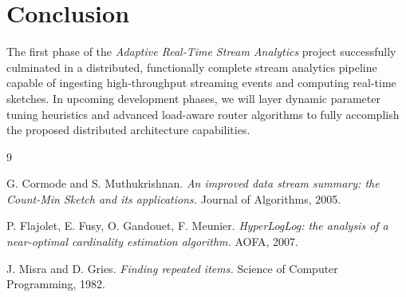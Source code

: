 \documentclass[12pt,a4paper]{article}
\begin{document}
\section{Conclusion}
The first phase of the \textit{Adaptive Real-Time Stream Analytics} project successfully culminated in a distributed, functionally complete stream analytics pipeline capable of ingesting high-throughput streaming events and computing real-time sketches. In upcoming development phases, we will layer dynamic parameter tuning heuristics and advanced load-aware router algorithms to fully accomplish the proposed distributed architecture capabilities.

\begin{thebibliography}{9}

G. Cormode and S. Muthukrishnan. 
\textit{An improved data stream summary: the Count-Min Sketch and its applications.} 
Journal of Algorithms, 2005.

P. Flajolet, E. Fusy, O. Gandouet, F. Meunier. 
\textit{HyperLogLog: the analysis of a near-optimal cardinality estimation algorithm.} 
AOFA, 2007.

J. Misra and D. Gries. 
\textit{Finding repeated items.} 
Science of Computer Programming, 1982.

\end{thebibliography}
\end{document}

